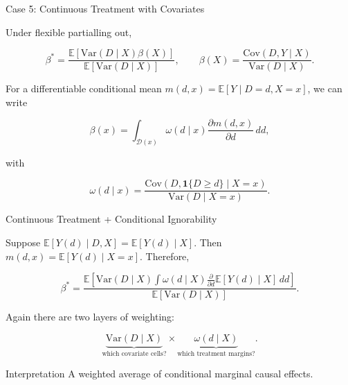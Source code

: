\documentclass[aspectratio=169,11pt]{beamer}
\begin{document}
\begin{frame}{Case 5: Continuous Treatment with Covariates}
\small

Under flexible partialling out,

\[
\beta^*
=
\frac{
\mathbb{E}
[
\mathrm{Var}(D\mid X)\beta(X)
]
}{
\mathbb{E}
[
\mathrm{Var}(D\mid X)
]
},
\qquad
\beta(X)
=
\frac{
\mathrm{Cov}(D,Y\mid X)
}{
\mathrm{Var}(D\mid X)
}.
\]

For a differentiable conditional mean
\(m(d,x)=\mathbb{E}[Y\mid D=d,X=x]\),
we can write

\[
\boxed{
\beta(x)
=
\int_{\mathcal{D}(x)}
\omega(d\mid x)
\frac{\partial m(d,x)}{\partial d}
\,dd,
}
\]

with

\[
\omega(d\mid x)
=
\frac{
\mathrm{Cov}
\left(
D,\mathbf{1}\{D\geq d\}\mid X=x
\right)
}{
\mathrm{Var}(D\mid X=x)
}.
\]

\end{frame}


\begin{frame}{Continuous Treatment + Conditional Ignorability}
\small

Suppose
\(\mathbb{E}[Y(d)\mid D,X]=\mathbb{E}[Y(d)\mid X]\).
Then \(m(d,x)=\mathbb{E}[Y(d)\mid X=x]\). Therefore,

\[
\boxed{
\beta^*
=
\frac{
\mathbb{E}
\left[
\mathrm{Var}(D\mid X)
\int
\omega(d\mid X)
\frac{\partial}{\partial d}
\mathbb{E}[Y(d)\mid X]
\,dd
\right]
}{
\mathbb{E}
[
\mathrm{Var}(D\mid X)
]
}.
}
\]

Again there are two layers of weighting:

\[
\boxed{
\underbrace{\mathrm{Var}(D\mid X)}_{\text{which covariate cells?}}
\times
\underbrace{\omega(d\mid X)}_{\text{which treatment margins?}}.
}
\]

\begin{block}{Interpretation}
A weighted average of conditional marginal causal effects.
\end{block}

\end{frame}


\end{document}
